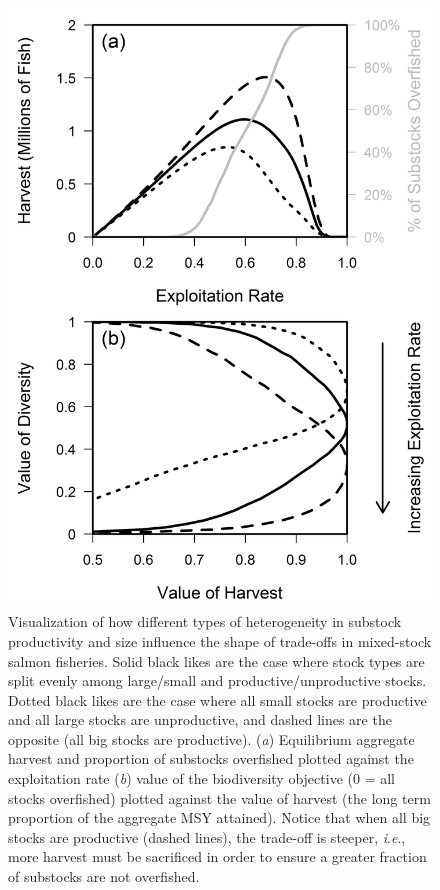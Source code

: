 \documentclass[12pt,]{book}
\theoremstyle{definition}
\theoremstyle{definition}
\theoremstyle{definition}
\theoremstyle{remark}
\begin{document}
\begin{figure}
  \centering
  \includegraphics[height = 16cm]{img/Ch4/trade-off-plot.png}
  \caption{Visualization of how different types of heterogeneity in substock productivity and size influence the shape of trade-offs in mixed-stock salmon fisheries. Solid black likes are the case where stock types are split evenly among large/small and productive/unproductive stocks. Dotted black likes are the case where all small stocks are productive and all large stocks are unproductive, and dashed lines are the opposite (all big stocks are productive). (\textit{a}) Equilibrium aggregate harvest and proportion of substocks overfished plotted against the exploitation rate (\textit{b}) value of the biodiversity objective (0 = all stocks overfished) plotted against the value of harvest (the long term proportion of the aggregate MSY attained). Notice that when all big stocks are productive (dashed lines), the trade-off is steeper, \textit{i}.\textit{e}., more harvest must be sacrificed in order to ensure a greater fraction of substocks are not overfished. }
  \label{fig:trade-off-plot}
\end{figure}
\end{document}
